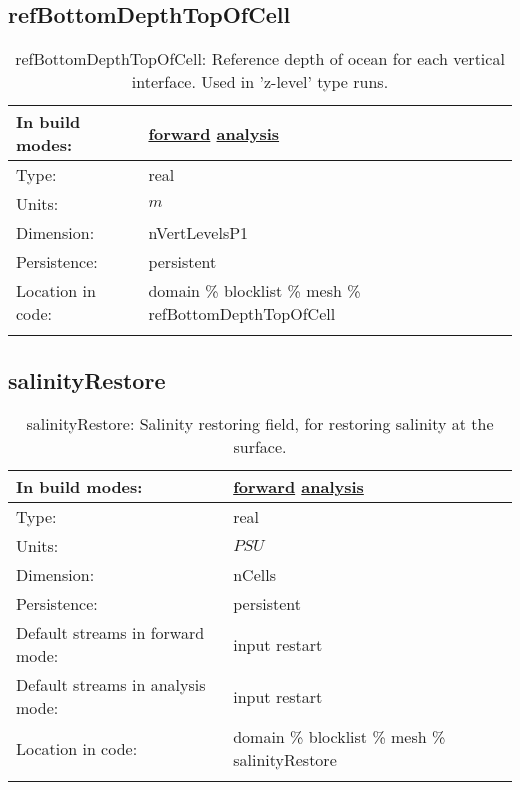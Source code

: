 \subsection[refBottomDepthTopOfCell]{refBottomDepthTopOfCell}
\label{subsec:var_sec_mesh_refBottomDepthTopOfCell}
\begin{center}
\begin{longtable}{| p{2.0in} | p{4.0in} |}
        \hline 
        In build modes: & \hyperref[subsec:forward_var_tab_mesh]{forward} \hyperref[subsec:analysis_var_tab_mesh]{analysis} \\
        \hline 
        Type: & real \\
        \hline 
        Units: & $m$ \\
        \hline 
        Dimension: & nVertLevelsP1 \\
        \hline 
        Persistence: & persistent \\
        \hline 
		 Location in code: & domain \% blocklist \% mesh \% refBottomDepthTopOfCell \\
		 \hline 
    \caption{refBottomDepthTopOfCell: Reference depth of ocean for each vertical interface. Used in 'z-level' type runs.}
\end{longtable}
\end{center}
\subsection[salinityRestore]{salinityRestore}
\label{subsec:var_sec_mesh_salinityRestore}
\begin{center}
\begin{longtable}{| p{2.0in} | p{4.0in} |}
        \hline 
        In build modes: & \hyperref[subsec:forward_var_tab_mesh]{forward} \hyperref[subsec:analysis_var_tab_mesh]{analysis} \\
        \hline 
        Type: & real \\
        \hline 
        Units: & $PSU$ \\
        \hline 
        Dimension: & nCells \\
        \hline 
        Persistence: & persistent \\
        \hline 
		 Default streams in forward mode: &  input restart \\
        \hline 
		 Default streams in analysis mode: &  input restart \\
        \hline 
		 Location in code: & domain \% blocklist \% mesh \% salinityRestore \\
		 \hline 
    \caption{salinityRestore: Salinity restoring field, for restoring salinity at the surface.}
\end{longtable}
\end{center}
